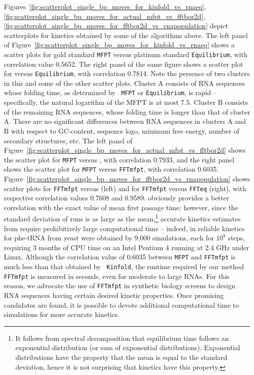 Figures~\ref{fig:scatterplot_single_bp_moves_for_kinfold_vs_rnaeq},
\ref{fig:scatterplot_single_bp_moves_for_actual_mfpt_vs_fftbor2d},
\ref{fig:scatterplot_single_bp_moves_for_fftbor2d_vs_rnapopulation}
depict scatterplots for kinetics obtained by some of the algorithms
above. The left panel of
Figure~\ref{fig:scatterplot_single_bp_moves_for_kinfold_vs_rnaeq}
shows a scatter plots for gold standard {\tt MFPT} versus platinum
standard {\tt Equilibrium}, with correlation value 0.5652. The right
panel of the same figure shows a scatter plot for \kinfold versus
{\tt Equilibrium}, with correlation 0.7814. Note the persence of two
clusters in this and some of the other scatter plots. Cluster A
consists of RNA sequences whose folding time, as determined by {\tt
MFPT} or {\tt Equilibrium}, is rapid -- specifically, the natural
logarithm of the MFPT is at most 7.5. Cluster B consists of the
remaining RNA sequences, whose folding time is longer than that of
cluster A. There are no significant differences between RNA sequences
in clusters A and B with respect to GC-content, sequence logo, minimum
free energy, number of secondary structures, etc.  The left panel of
Figure~\ref{fig:scatterplot_single_bp_moves_for_actual_mfpt_vs_fftbor2d}
shows the scatter plot for {\tt MFPT} versus \kinfold, with
correlation 0.7933, and the right panel shows the scatter plot for
{\tt MFPT} versus {\tt FFTmfpt}, with correlation 0.6035.
Figure~\ref{fig:scatterplot_single_bp_moves_for_fftbor2d_vs_rnapopulation}
shows scatter plots for {\tt FFTmfpt} versus \kinfold (left) and
for {\tt FFTmfpt} versus {\tt FFTeq} (right), with respective
correlation values 0.7608 and 0.9589. \kinfold obviously provides
a better correlation with the exact value of mean first passage time;
however, since the standard deviation of \kinfold runs is as
large as the mean,\footnote{It follows from spectral decomposition that
equilibrium time follows an exponential distribution (or sum of
exponential distributions). Exponential distributions have the property
that the mean is equal to the standard deviation, hence
it is not surprising that \kinfold
kinetics have this property.} accurate kinetics estimates
from \kinfold require prohibitively large computational time -- indeed, in
\cite{wolfingerStadler:kinetics} reliable kinetics for phe-tRNA from
yeast were obtained by 9,000 \kinfold simulations, each for $10^8$
steps, requiring 3 months of CPU time on an Intel Pentium 4 running at
2.4 GHz under Linux. Although the correlation value of 0.6035 between
{\tt MFPT} and {\tt FFTmfpt} is much less than that obtained by {\tt
Kinfold}, the runtime required by our method {\tt FFTmfpt} is measured
in seconds, even for moderate to large RNAs. For this reason, we
advocate the use of {\tt FFTmfpt} in synthetic biology screens to
design RNA sequences having certain desired kinetic properties. Once
promising candidates are found, it is possible to devote additional
computational time to \kinfold simulations for more accurate
kinetics.


